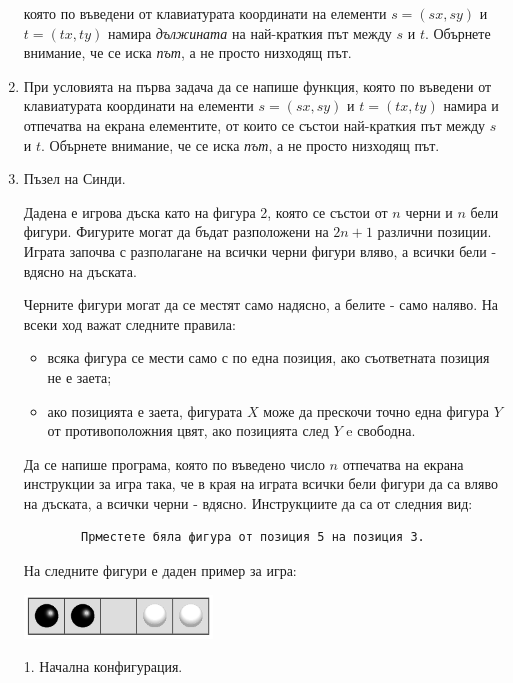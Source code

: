 \documentclass[12pt,a4paper]{article}
\begin{document}
\begin{enumerate}
	която по въведени от клавиатурата координати на елементи $s=(sx,sy)$ и $t=(tx,ty)$ намира \textit {дължината} на най-краткия път между $s$ и $t$. Обърнете внимание, че се иска \textit{път}, а не просто низходящ път.

	\item 

	При условията на първа задача да се напише функция, която по въведени от клавиатурата координати на елементи $s=(sx,sy)$ и $t=(tx,ty)$ намира и отпечатва на екрана елементите, от които се състои най-краткия път между $s$ и $t$. Обърнете внимание, че се иска \textit{път}, а не просто низходящ път.


	\item Пъзел на Синди\cite{cindy}.

	Дадена е игрова дъска като на фигура 2, която се състои от $n$ черни и $n$ бели фигури. Фигурите могат да бъдат разположени на $2n+1$ различни позиции. Играта започва с разполагане на всички черни фигури вляво, а всички бели - вдясно на дъската.

	Черните фигури могат да се местят само надясно, а белите - само наляво. На всеки ход важат следните правила:


	\begin{itemize}
		\item всяка фигура се мести само с по една позиция, ако съответната позиция не е заета;
		\item ако позицията е заета, фигурата $X$ може да прескочи точно една фигура $Y$ от противоположния цвят, ако позицията след $Y$ e свободна.
	\end{itemize}

	Да се напише програма, която по въведено число $n$ отпечатва на екрана инструкции за игра така, че в края на играта всички бели фигури да са вляво на дъската, а всички черни - вдясно. Инструкциите да са от следния вид:

	\begin{verbatim}
		Прместете бяла фигура от позиция 5 на позиция 3.
	\end{verbatim}

	На следните фигури е даден пример за игра:

	\begin{flushleft}
	\includegraphics[width=5cm]{images/step0}

	1. Начална конфигурация.
	\end{flushleft}



\end{enumerate}
\end{document}

